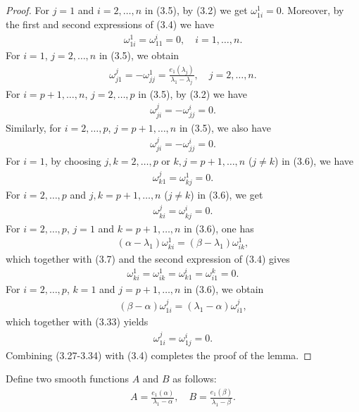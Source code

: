 \documentclass[twoside,reqno,A4]{amsart}
\theoremstyle{definition}
\theoremstyle{remark}
\numberwithin{equation}{section}
\begin{document}
\begin{proof}
For $j=1$ and $i=2,\ldots,n$ in (3.5), by (3.2) we get
$\omega_{1i}^1=0$. Moreover, by the first and second expressions of
(3.4) we have
\begin{eqnarray}
\omega_{1i}^1=\omega_{11}^i=0,\quad i=1, \ldots, n.
\end{eqnarray}
For $i=1$, $j=2, \ldots, n$ in (3.5), we obtain
\begin{eqnarray}
\omega_{j1}^j=-\omega_{jj}^1=\frac{e_1(\lambda_j)}{\lambda_1-\lambda_j},
\quad j=2, \ldots, n.
\end{eqnarray}
For $i=p+1,\ldots,n$, $j=2,\ldots, p$ in (3.5), by (3.2) we have
\begin{eqnarray}
\omega_{ji}^j=-\omega_{jj}^i=0.
\end{eqnarray}
Similarly, for $i=2,\ldots, p$, $j=p+1,\ldots,n$ in (3.5), we also
have
\begin{eqnarray}
\omega_{ji}^j=-\omega_{jj}^i=0.
\end{eqnarray}
For $i=1$, by choosing $j, k=2,\ldots,p$ or $k, j=p+1,\ldots,n$
($j\neq k$) in (3.6), we have
\begin{eqnarray}
\omega_{k1}^j=\omega_{kj}^1=0.
\end{eqnarray}
For $i=2,\ldots, p$ and $j, k=p+1,\ldots, n$ ($j\neq k$) in (3.6),
we get
\begin{eqnarray}
\omega_{ki}^j=\omega_{kj}^i=0.
\end{eqnarray}
For $i=2,\ldots, p$, $j=1$ and $k=p+1,\ldots, n$ in (3.6), one has
\begin{eqnarray*}
(\alpha-\lambda_1)\omega_{ki}^1=(\beta-\lambda_1)\omega_{ik}^1,
\end{eqnarray*}
which together with (3.7) and the second expression of (3.4) gives
\begin{eqnarray}
\omega_{ki}^1=\omega_{ik}^1=\omega_{k1}^i=\omega_{i1}^k=0.
\end{eqnarray}
For $i=2,\ldots, p$, $k=1$ and $j=p+1,\ldots, n$ in (3.6), we obtain
\begin{eqnarray*}
(\beta-\alpha)\omega_{1i}^j=(\lambda_1-\alpha)\omega_{i1}^j,
\end{eqnarray*}
which together with (3.33) yields
\begin{eqnarray}
\omega_{1i}^j=\omega_{1j}^i=0.
\end{eqnarray}
Combining (3.27-3.34) with (3.4) completes the proof of the lemma.
\end{proof}
Define two smooth functions $A$ and $B$ as follows:
\begin{eqnarray}
A=\frac{e_1(\alpha)}{\lambda_1-\alpha},\quad
B=\frac{e_1(\beta)}{\lambda_1-\beta}.
\end{eqnarray}
\end{document}

